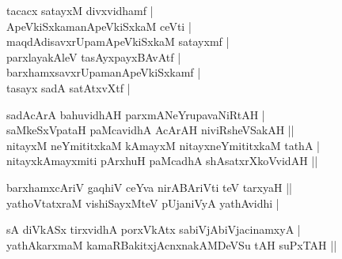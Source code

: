 \begin{entry}
\medskip
\begin{shl}
tacacx satayxM divxvidhamf |\\[2pt]
ApeVkiSxkamanApeVkiSxkaM ceVti |\\[2pt]
maqdAdisavxrUpamApeVkiSxkaM satayxmf |\\[2pt]
parxlayakAleV tasAyxpayxBAvAtf |\\[2pt]
barxhamxsavxrUpamanApeVkiSxkamf |\\[2pt]
tasayx sadA satAtxvXtf |\\[-1pt]
\end{shl}
\smallskip
{}
\medskip
{}
\medskip
\begin{shl}
sadAcArA bahuvidhAH parxmANeYrupavaNiRtAH |\\[2pt]
saMkeSxVpataH paMcavidhA AcArAH niviRsheVSakAH ||\\[2pt]
nitayxM neYmititxkaM kAmayxM nitayxneYmititxkaM tathA |\\[2pt]
nitayxkAmayxmiti pArxhuH paMcadhA shAsatxrXkoVvidAH ||\\[-1pt]
\end{shl}
\medskip
{}
\medskip
{}
\medskip
\begin{shl}
barxhamxcAriV gaqhiV ceYva nirABAriVti teV tarxyaH ||\\[2pt]
yathoVtatxraM vishiSayxMteV pUjaniVyA yathAvidhi |\\[-1pt]
\end{shl}
\medskip
{}
\medskip
{}
\medskip
\begin{shl}
sA diVkASx tirxvidhA porxVkAtx sabiVjAbiVjacinamxyA |\\[2pt]
yathAkarxmaM kamaRBakitxjAcnxnakAMDeVSu tAH suPxTAH ||\\[-1pt]
\end{shl}
\medskip
{}

\end{entry}
